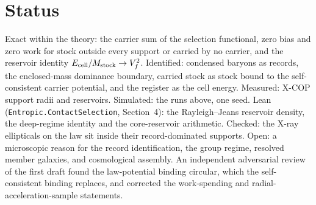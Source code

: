 \documentclass[11pt]{article}
\begin{document}
\section{Status}
Exact within the theory: the carrier sum of the selection functional, zero bias and zero
work for stock outside every support or carried by no carrier, and the reservoir
identity $E_{\rm cell}/M_{\rm stock}\to V_f^2$. Identified: condensed baryons as records,
the enclosed-mass dominance boundary, carried stock as stock bound to the self-consistent
carrier potential, and the register as the cell energy. Measured: X-COP support radii and
reservoirs. Simulated: the runs above, one seed. Lean
(\texttt{Entropic.ContactSelection}, Section~4): the Rayleigh--Jeans reservoir density,
the deep-regime identity and the core-reservoir arithmetic. Checked: the X-ray ellipticals on the
law sit inside their record-dominated supports. Open: a microscopic reason for the
record identification, the group regime, resolved member galaxies, and cosmological
assembly. An independent adversarial review of the first draft found the
law-potential binding circular, which the self-consistent binding replaces, and
corrected the work-spending and radial-acceleration-sample statements.
\end{document}
